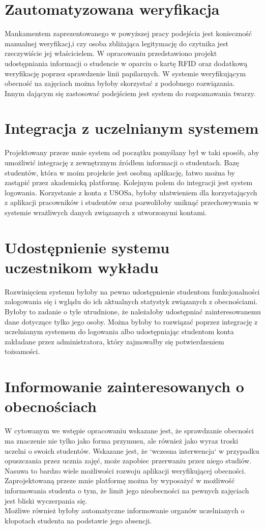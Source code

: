 \documentclass[declaration,shortabstract, mgr]{iithesis}
\begin{document}
\section{Zautomatyzowana weryfikacja}
\indent Mankamentem zaprezentowanego w powyższej pracy podejścia jest konieczność manualnej weryfikacj,i czy osoba zbliżająca legitymację do czytnika jest rzeczywiście jej właścicielem. W opracowaniu \cite{fingerprint} przedstawiono projekt udostępniania informacji o studencie w oparciu o kartę RFID oraz dodatkową weryfikację poprzez sprawdzenie linii papilarnych. W systemie weryfikującym obecność na zajęciach można byłoby skorzystać z podobnego rozwiązania.\\
\indent Innym dającym się zastosować podejściem jest system do rozpoznawania twarzy.
\section{Integracja z uczelnianym systemem}
\indent Projektowany przeze mnie system od początku pomyślany był w taki sposób, aby umożliwić integrację z zewnętrznym źródłem informacji o studentach. Bazę studentów, która w moim projekcie jest osobną aplikację, łatwo można by zastąpić przez akademicką platformę. Kolejnym polem do integracji jest system logowania. Korzystanie z konta z USOSa, byłoby ułatwieniem dla korzystających z aplikacji pracowników i studentów oraz pozwoliłoby uniknąć przechowywania w systemie wrażliwych danych związanych z utworzonymi kontami.
\section{Udostępnienie systemu uczestnikom wykładu}
\indent Rozwinięciem systemu byłoby na pewno udostępnienie studentom funkcjonalności zalogowania się i wglądu do ich aktualnych statystyk związanych z obecnościami. Byłoby to zadanie o tyle utrudnione, że należałoby udostępniać zainteresowanemu dane dotyczące tylko jego osoby. Można byłoby to rozwiązać poprzez integrację z uczelnianym systemem do logowania albo udostępniając studentom konta zakładane przez administratora, który zajmowałby się potwierdzeniem tożsamości.
\section{Informowanie zainteresowanych o obecnościach}
\indent W cytowanym we wstępie opracowaniu \cite{theory_base} wskazane jest, że sprawdzanie obecności ma znaczenie nie tylko jako forma przymusu, ale również jako wyraz troski uczelni o swoich studentów. Wskazane jest, że `wczesna interwencja` w przypadku opuszczania przez ucznia zajęć, może zapobiec przerwaniu przez niego studiów. Nasuwa to bardzo wiele możliwości rozwoju aplikacji weryfikującej obecności. Zaprojektowaną przeze mnie platformę można by wyposażyć w możliwość informowania studenta o tym, że limit jego nieobecności na pewnych zajęciach jest bliski wyczerpania się. \\
\indent Możliwe również byłoby automatyczne informowanie organów uczelnianych o kłopotach studenta na podstawie jego absencji. \\
\end{document}
